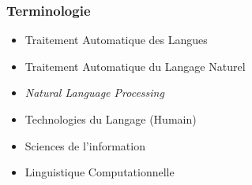 
\begin{frame}
\frametitle{Terminologie}
\begin{itemize}
\item Traitement Automatique des Langues
\item Traitement Automatique du Langage Naturel
\pause
\item \textit{Natural Language Processing} 
\item Technologies du Langage (Humain)
\item Sciences de l'information
\item Linguistique Computationnelle
\end{itemize}
\end{frame}

